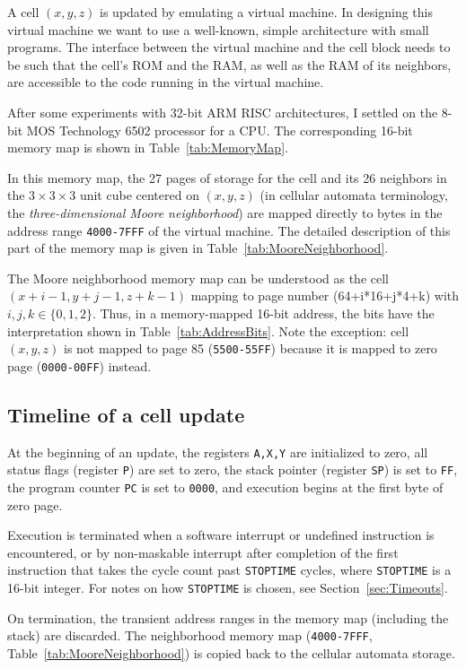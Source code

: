 \documentclass{article}
\newcommand\hex[1]{{\tt #1}}
\newcommand\hexrange[2]{\hex{#1}{\tt -}\hex{#2}}
\begin{document}
A cell $(x,y,z)$ is updated by emulating a virtual machine.
In designing this virtual machine we want to use a well-known, simple architecture with small programs.
The interface between the virtual machine and the cell block
needs to be such that the cell's ROM and the RAM, as well as the RAM of its neighbors,
are accessible to the code running in the virtual machine.

After some experiments with 32-bit ARM RISC architectures,
I settled on the 8-bit MOS Technology 6502 processor for a CPU.
The corresponding 16-bit memory map is shown in Table~\ref{tab:MemoryMap}.

In this memory map, the 27 pages of storage
for the cell and its 26 neighbors
in the $3 \times 3 \times 3$ unit cube centered on $(x,y,z)$
(in cellular automata terminology, the {\em three-dimensional Moore neighborhood})
are mapped directly to bytes in the address range \hexrange{4000}{7FFF} of the virtual machine.
The detailed description of this part of the memory map
is given in Table~\ref{tab:MooreNeighborhood}.

The Moore neighborhood memory map can be understood as the cell $(x+i-1,y+j-1,z+k-1)$
mapping to page number (64+i*16+j*4+k) with $i,j,k \in \{0,1,2\}$.
Thus, in a memory-mapped 16-bit address, the bits have the interpretation shown in Table~\ref{tab:AddressBits}.
Note the exception: cell $(x,y,z)$ is not mapped to page 85 (\hexrange{5500}{55FF})
because it is mapped to zero page (\hexrange{0000}{00FF}) instead.

\subsection{Timeline of a cell update}
\label{sec:Timeline}

At the beginning of an update,
the registers {\tt A,X,Y} are initialized to zero,
all status flags (register {\tt P}) are set to zero,
the stack pointer (register {\tt SP}) is set to \hex{FF},
the program counter {\tt PC} is set to \hex{0000},
and execution begins at the first byte of zero page.

Execution is terminated
when a software interrupt or undefined instruction is encountered,
or by non-maskable interrupt after
completion of the first instruction that takes the cycle count past {\tt STOPTIME} cycles,
where {\tt STOPTIME} is a 16-bit integer.
For notes on how {\tt STOPTIME} is chosen, see Section~\ref{sec:Timeouts}.

On termination, the transient address ranges in the memory map
(including the stack)
are discarded.
The neighborhood memory map (\hexrange{4000}{7FFF}, Table~\ref{tab:MooreNeighborhood})
is copied back to the cellular automata storage.
\end{document}
